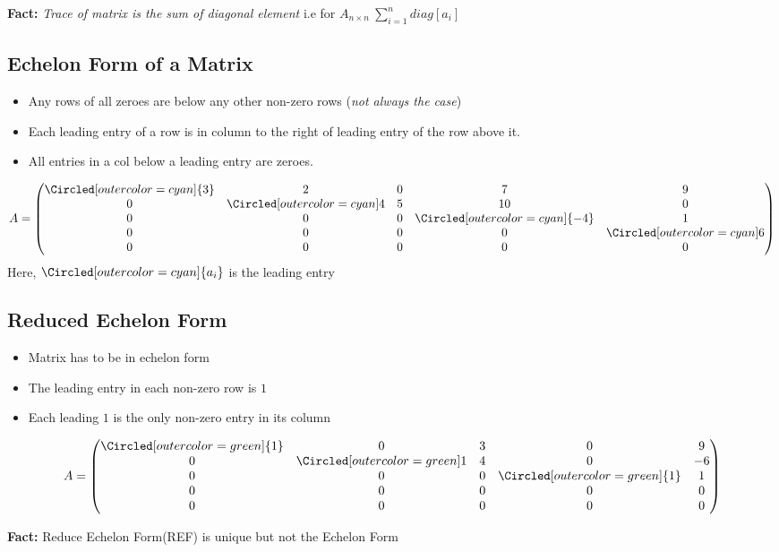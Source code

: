 \documentclass[12pt]{article}
\begin{document}
\textbf{Fact: }\textit{Trace of matrix is the sum of diagonal element} i.e for $A_{n\times n} \: \sum_{i=1}^{n} diag[a_i]$

\subsection*{Echelon Form of a Matrix}
\begin{itemize}
	\item Any rows of all zeroes are below any other non-zero rows (\textit{not always the case})
	\item Each leading entry of a row is in column to the right of leading entry of the row above it.
	\item All entries in a col below a leading entry are zeroes.
\end{itemize}
\[
	A = \begin{pmatrix}
	\Circled[outer color=cyan]{3} & 2 & 0 & 7 & 9\\
	0 & \Circled[outer color=cyan]4 & 5 & 10 & 0\\
	0 & 0 & 0 & \Circled[outer color=cyan]{-4} & 1\\
	0 & 0 & 0 & 0 &\Circled[outer color=cyan] 6\\
	0 & 0 & 0 & 0 & 0
	\end{pmatrix}
\]
Here, $	\Circled[outer color=cyan]{a_i}$ is the leading entry

\subsection*{Reduced Echelon Form}
\begin{itemize}
	\item Matrix has to be in echelon form
	\item The leading entry in each non-zero row is $1$
	\item Each leading $1$ is the only non-zero entry in its column
\end{itemize}

\[
		A = \begin{pmatrix}
	\Circled[outer color=green]{1} & 0 & 3 & 0 & 9\\
	0 & \Circled[outer color=green]1 & 4 & 0 & -6\\
	0 & 0 & 0 & \Circled[outer color=green]{1} & 1\\
	0 & 0 & 0 & 0 & 0\\
	0 & 0 & 0 & 0 & 0
	\end{pmatrix}
\]

\textbf{Fact:} Reduce Echelon Form(REF) is unique but not the Echelon Form
\end{document}
